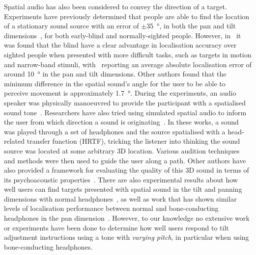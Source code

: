 \documentclass[sigconf, screen=true, anonymous=true]{acmart}
\begin{document}
Spatial audio has also been considered to convey the direction of a target.
Experiments have previously determined that people are able to find the location of a stationary sound source with an error of $\pm$\SI{35}{\degree}, in both the pan and tilt dimensions~\cite{zwiers2001spatial}, for both early-blind and normally-sighted people.
However, in~\cite{lewald2013exceptional, lessard1998early} it was found that the blind have a clear advantage in localisation accuracy over sighted people when presented with more difficult tasks, such as targets in motion and narrow-band stimuli, with~\cite{lewald2013exceptional} reporting an average absolute localisation error of around \SI{10}{\degree} in the pan and tilt dimensions.
Other authors found that the minimum difference in the spatial sound's angle for the user to be able to perceive movement is approximately \SI{1.7}{\degree}. During the experiments, an audio speaker was physically manoeuvred to provide the participant with a spatialised sound tone~\cite{ashmead1998spatial}.
Researchers have also tried using simulated spatial audio to inform the user from which direction a sound is originating~\cite{holland2002audiogps, kammoun2012navigation, rebillat2009smart, menelas2010audio, wilson2007swan, zotkin2004rendering}.
In these works, a sound was played through a set of headphones and the source spatialised with a head-related transfer function (HRTF), tricking the listener into thinking the sound source was located at some arbitrary 3D location.
Various audition techniques and methods were then used to guide the user along a path.
Other authors have also provided a framework for evaluating the quality of this 3D sound in terms of its psychoacoustic properties~\cite{guastavino2004perceptual, nicol2014roadmap}.
There are also experimental results about how well users can find targets presented with spatial sound in the tilt and panning dimensions with normal headphones~\cite{katz2011spatial, zwiers2001spatial}, as well as work that has shown similar levels of localisation performance between normal and bone-conducting headphones in the pan dimension~\cite{macdonald2006spatial}.
However, to our knowledge no extensive work or experiments have been done to determine how well users respond to tilt adjustment instructions using a tone with \emph{varying pitch}, in particular when using bone-conducting headphones. 
\end{document}
